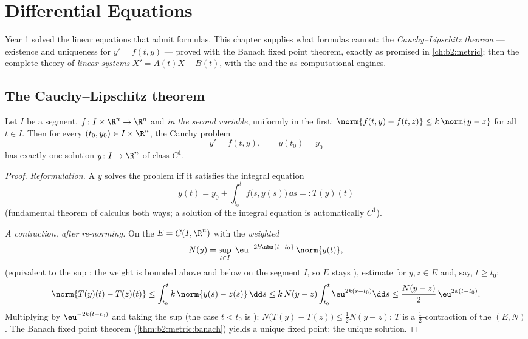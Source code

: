\chapter{Differential Equations}\label{ch:b2:diffeq}

Year 1 solved the linear equations that admit formulas. This chapter
supplies what formulas cannot: the \emph{Cauchy--Lipschitz theorem}
--- existence and uniqueness for $y' = f(t, y)$ --- proved with the
Banach fixed point theorem, exactly as promised in
\cref{ch:b2:metric}; then the complete theory of \emph{linear
systems} $X' = A(t)X + B(t)$, with the  and the
 as computational engines.

\section{The Cauchy--Lipschitz theorem}

\begin{theorem}\label{thm:b2:diffeq:cauchylipschitz}
Let $I$ be a segment, $f \colon I \times \R^n \to \R^n$ 
and \emph{ in the second variable}, uniformly in the
first: $\norm{f(t, y) - f(t, z)} \leq k\,\norm{y - z}$ for all $t
\in I$. Then for every $(t_0, y_0) \in I \times \R^n$, the Cauchy
problem
\[
y' = f(t, y), \qquad y(t_0) = y_0
\]
has exactly one solution $y \colon I \to \R^n$ of class $C^1$.
\end{theorem}

\begin{proof}
\emph{Reformulation.} A  $y$ solves the problem iff it
satisfies the integral equation
\[
y(t) = y_0 + \int_{t_0}^{t} f\bigl(s, y(s)\bigr)\,\dd s
=: T(y)(t)
\]
(fundamental theorem of calculus both ways; a  solution
of the integral equation is automatically $C^1$).

\emph{A contraction, after re-norming.} On the  $E =
C(I, \R^n)$ with the \emph{weighted} 
\[
N(y) = \sup_{t \in I}\; \eu^{-2k\abs{t - t_0}}\,\norm{y(t)} ,
\]
(equivalent to the sup : the weight is bounded above and below
on the segment $I$, so $E$ stays ), estimate for $y, z \in
E$ and, say, $t \geq t_0$:
\[
\norm{T(y)(t) - T(z)(t)}
\leq \int_{t_0}^{t} k\,\norm{y(s) - z(s)}\,\dd s
\leq k\,N(y - z)\int_{t_0}^{t} \eu^{2k(s - t_0)}\dd s
\leq \frac{N(y-z)}{2}\,\eu^{2k(t - t_0)} .
\]
Multiplying by $\eu^{-2k(t - t_0)}$ and taking the sup (the case $t
< t_0$ is ): $N\bigl(T(y) - T(z)\bigr) \leq \frac12 N(y -
z)$: $T$ is a $\frac12$-contraction of the  $(E, N)$. The
Banach fixed point theorem (\cref{thm:b2:metric:banach}) yields a
unique fixed point: the unique solution.
\end{proof}

